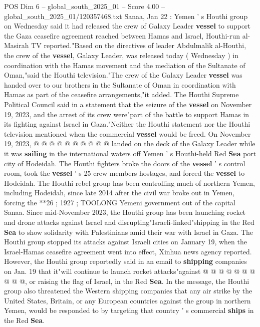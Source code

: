 \begin{textsample}{POS Dim 6 – global\_south\_2025\_01 – Score 4.00 – global\_south\_2025\_01/120357468.txt}  \label{ex:f6_pos_352}
Sanaa, Jan 22 : Yemen ' s Houthi group on Wednesday said it had released the crew of Galaxy Leader \textbf{vessel} to support the Gaza ceasefire agreement reached between Hamas and Israel, Houthi-run al-Masirah TV reported."Based on the directives of leader Abdulmalik al-Houthi, the crew of the \textbf{vessel}, Galaxy Leader, was released today ( Wednesday ) in coordination with the Hamas movement and the mediation of the Sultanate of Oman,"said the Houthi television."The crew of the Galaxy Leader \textbf{vessel} was handed over to our brothers in the Sultanate of Oman in coordination with Hamas as part of the ceasefire arrangements,"it added.
The Houthi Supreme Political Council said in a statement that the seizure of the \textbf{vessel} on November 19, 2023, and the arrest of its crew were"part of the battle to support Hamas in its fighting against Israel in Gaza."Neither the Houthi statement nor the Houthi television mentioned when the commercial \textbf{vessel} would be freed.
On November 19, 2023, @ @ @ @ @ @ @ @ @ @ landed on the deck of the Galaxy Leader while it was \textbf{sailing} in the international waters off Yemen ' s Houthi-held Red \textbf{Sea} port city of Hodeidah.
The Houthi fighters broke the doors of the \textbf{vessel} ' s control room, took the \textbf{vessel} ' s 25 crew members hostages, and forced the \textbf{vessel} to Hodeidah.
The Houthi rebel group has been controlling much of northern Yemen, including Hodeidah, since late 2014 after the civil war broke out in Yemen, forcing the **26 ; 1927 ; TOOLONG Yemeni government out of the capital Sanaa.
Since mid-November 2023, the Houthi group has been launching rocket and drone attacks against Israel and disrupting"Israeli-linked"shipping in the Red \textbf{Sea} to show solidarity with Palestinians amid their war with Israel in Gaza.
The Houthi group stopped its attacks against Israeli cities on January 19, when the Israel-Hamas ceasefire agreement went into effect, Xinhua news agency reported.
However, the Houthi group reportedly said in an email to \textbf{shipping} companies on Jan. 19 that it"will continue to launch rocket attacks"against @ @ @ @ @ @ @ @ @ @, or raising the flag of Israel, in the Red \textbf{Sea}.
In the message, the Houthi group also threatened the Western shipping companies that any air strike by the United States, Britain, or any European countries against the group in northern Yemen, would be responded to by targeting that country ' s commercial \textbf{ships} in the Red \textbf{Sea}.

\end{textsample}
